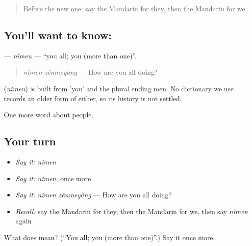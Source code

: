 \label{lesson:ZH-C31-nimen}



\begin{quote}
Before the new one: say the Mandarin for they, then the Mandarin for we.
\end{quote}

\subsection*{You'll want to know: }
\textbf{} — \emph{nǐmen} — \textquotedblleft{}you all; you (more than one)\textquotedblright{}.

\begin{quote}
\emph{nǐmen zěnmeyàng} — How are you all doing?
\end{quote}

\begin{cousinweb}
\textbf{} (\emph{nǐmen}) is built from  'you' and the plural ending men. No dictionary we use records an older form of either, so its history is not settled.
\end{cousinweb}

\begin{grammarlens}[title={What you've built}]
One more word about people.
\end{grammarlens}

\subsection*{Your turn}
\begin{itemize}
\raggedright
  \item \emph{Say it:} \emph{nǐmen}
  \item \emph{Say it:} \emph{nǐmen}, once more
  \item \emph{Say it:} \emph{nǐmen zěnmeyàng} — How are you all doing?
  \item \emph{Recall:} say the Mandarin for they, then the Mandarin for we, then say \emph{nǐmen} again
\end{itemize}

\begin{tcolorbox}[breakable,colback=teal!4,colframe=teal!35!black,title={Before you move on}]
What does  mean? (\textquotedblleft{}You all; you (more than one)\textquotedblright{}.) Say it once more.
\end{tcolorbox}
